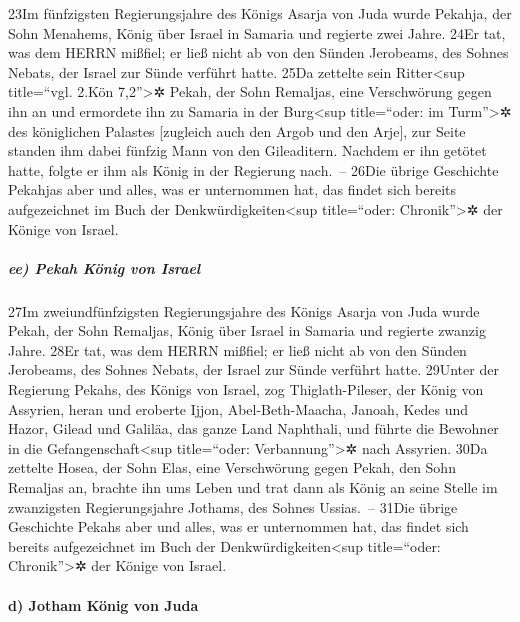 23Im fünfzigsten Regierungsjahre des Königs Asarja von Juda wurde
Pekahja, der Sohn Menahems, König über Israel in Samaria und regierte
zwei Jahre. 24Er tat, was dem HERRN mißfiel; er ließ nicht ab von den
Sünden Jerobeams, des Sohnes Nebats, der Israel zur Sünde verführt
hatte. 25Da zettelte sein Ritter\textless sup title=``vgl. 2.Kön
7,2''\textgreater✲ Pekah, der Sohn Remaljas, eine Verschwörung gegen ihn
an und ermordete ihn zu Samaria in der Burg\textless sup title=``oder:
im Turm''\textgreater✲ des königlichen Palastes {[}zugleich auch den
Argob und den Arje{]}, zur Seite standen ihm dabei fünfzig Mann von den
Gileaditern. Nachdem er ihn getötet hatte, folgte er ihm als König in
der Regierung nach.~-- 26Die übrige Geschichte Pekahjas aber und alles,
was er unternommen hat, das findet sich bereits aufgezeichnet im Buch
der Denkwürdigkeiten\textless sup title=``oder: Chronik''\textgreater✲
der Könige von Israel.

\hypertarget{ee-pekah-kuxf6nig-von-israel}{%
\subparagraph{ee) Pekah König von
Israel}\label{ee-pekah-kuxf6nig-von-israel}}

27Im zweiundfünfzigsten Regierungsjahre des Königs Asarja von Juda wurde
Pekah, der Sohn Remaljas, König über Israel in Samaria und regierte
zwanzig Jahre. 28Er tat, was dem HERRN mißfiel; er ließ nicht ab von den
Sünden Jerobeams, des Sohnes Nebats, der Israel zur Sünde verführt
hatte. 29Unter der Regierung Pekahs, des Königs von Israel, zog
Thiglath-Pileser, der König von Assyrien, heran und eroberte Ijjon,
Abel-Beth-Maacha, Janoah, Kedes und Hazor, Gilead und Galiläa, das ganze
Land Naphthali, und führte die Bewohner in die
Gefangenschaft\textless sup title=``oder: Verbannung''\textgreater✲ nach
Assyrien. 30Da zettelte Hosea, der Sohn Elas, eine Verschwörung gegen
Pekah, den Sohn Remaljas an, brachte ihn ums Leben und trat dann als
König an seine Stelle im zwanzigsten Regierungsjahre Jothams, des Sohnes
Ussias.~-- 31Die übrige Geschichte Pekahs aber und alles, was er
unternommen hat, das findet sich bereits aufgezeichnet im Buch der
Denkwürdigkeiten\textless sup title=``oder: Chronik''\textgreater✲ der
Könige von Israel.

\hypertarget{d-jotham-kuxf6nig-von-juda}{%
\paragraph{d) Jotham König von Juda}\label{d-jotham-kuxf6nig-von-juda}}

